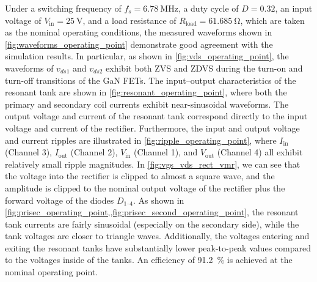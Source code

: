 \documentclass[journal, 9pt, letterpaper, english]{IEEEtran}[2015/08/26]
\begin{document}
Under a switching frequency of $f_s = \qty{6.78}{\mega\hertz}$, a duty cycle of $D = 0.32$, an input voltage of $V_{\mathrm{in}} = \qty{25}{\volt}$, and a load resistance of $R_\mathrm{load} = \qty{61.685}{\ohm}$, which are taken as the nominal operating conditions, the measured waveforms shown in \cref{fig:waveforms_operating_point} demonstrate good agreement with the simulation results.
In particular, as shown in \cref{fig:vds_operating_point}, the waveforms of $v_{ds1}$ and $v_{ds2}$ exhibit both ZVS and ZDVS during the turn-on and turn-off transitions of the GaN FETs. The input--output characteristics of the resonant tank are shown in \cref{fig:resonant_operating_point}, where both the primary and secondary coil currents exhibit near-sinusoidal waveforms. The output voltage and current of the resonant tank correspond directly to the input voltage and current of the rectifier. Furthermore, the input and output voltage and current ripples are illustrated in \cref{fig:ripple_operating_point}, where $I_{\mathrm{in}}$ (Channel 3), $I_{\mathrm{out}}$ (Channel 2), $V_{\mathrm{in}}$ (Channel 1), and $V_{\mathrm{out}}$ (Channel 4) all exhibit relatively small ripple magnitudes.
In \cref{fig:vgs_vds_rect_vmr}, we can see that the voltage into the rectifier is clipped to almost a square wave, and the amplitude is clipped to the nominal output voltage of the rectifier plus the forward voltage of the diodes $D_{1\text{--}4}$.
As shown in \cref{fig:prisec_operating_point,,fig:prisec_second_operating_point}, the resonant tank currents are fairly sinusoidal (especially on the secondary side), while the tank voltages are closer to triangle waves.
Additionally, the voltages entering and exiting the resonant tanks have substantially lower peak-to-peak values compared to the voltages inside of the tanks.
An efficiency of \qty{91.2}{\percent} is achieved at the nominal operating point.

\end{document}
